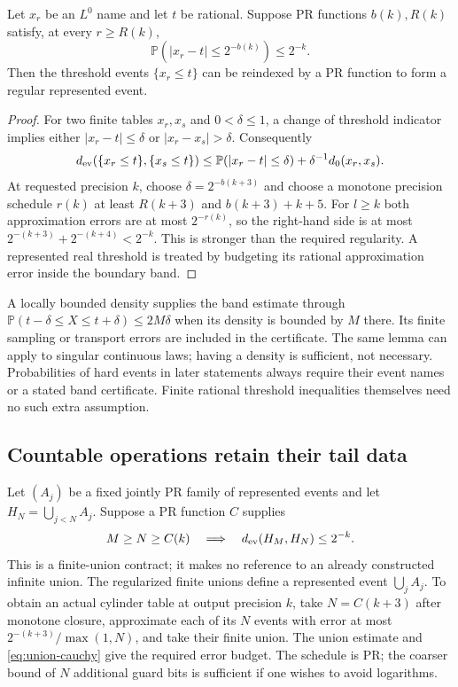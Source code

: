 \begin{lemma}
Let $x_r$ be an $L^0$ name and let $t$ be rational. Suppose PR functions
$b(k),R(k)$ satisfy, at every $r\ge R(k)$,
\[
 \mathbb P(|x_r-t|\le2^{-b(k)})\le2^{-k}.
\]
Then the threshold events $\{x_r\le t\}$ can be reindexed by a PR function
to form a regular represented event.
\end{lemma}
\begin{proof}
For two finite tables $x_r,x_s$ and $0<\delta\le1$, a change of threshold
indicator implies either $|x_r-t|\le\delta$ or $|x_r-x_s|>\delta$.
Consequently
\[
 d_{\rm ev}(\{x_r\le t\},\{x_s\le t\})
 \le\mathbb P(|x_r-t|\le\delta)+\delta^{-1}d_0(x_r,x_s).
\]
At requested precision $k$, choose $\delta=2^{-b(k+3)}$ and choose a
monotone precision schedule $r(k)$ at least
$R(k+3)$ and $b(k+3)+k+5$. For $l\ge k$ both approximation errors are
at most $2^{-r(k)}$, so the right-hand side is at most
$2^{-(k+3)}+2^{-(k+4)}<2^{-k}$. This is stronger than the required
regularity. A represented real threshold is treated by budgeting its rational
approximation error inside the boundary band.
\end{proof}

A locally bounded density supplies the band estimate through
$\mathbb P(t-\delta\le X\le t+\delta)\le2M\delta$ when its density is
bounded by $M$ there. Its finite sampling or transport errors are included
in the certificate. The same lemma can apply to singular continuous laws;
having a density is sufficient, not necessary. Probabilities of hard events
in later statements always require their event names or a stated band
certificate. Finite rational threshold inequalities themselves need no such
extra assumption.

\subsection{Countable operations retain their tail data}

Let $(A_j)$ be a fixed jointly PR family of represented events and let
$H_N=\bigcup_{j<N}A_j$. Suppose a PR function $C$ supplies
\begin{equation}\label{eq:union-cauchy}
 M\ge N\ge C(k)\quad\Longrightarrow\quad
 d_{\rm ev}(H_M,H_N)\le2^{-k}.
\end{equation}
This is a finite-union contract; it makes no reference to an already
constructed infinite union. The regularized finite unions define a
represented event $\bigcup_jA_j$. To obtain an actual cylinder table at
output precision $k$, take $N=C(k+3)$ after monotone closure, approximate
each of its $N$ events with error at most $2^{-(k+3)}/\max(1,N)$, and take
their finite union. The union estimate and \eqref{eq:union-cauchy} give the
required error budget. The schedule is PR; the coarser bound of $N$ additional
guard bits is sufficient if one wishes to avoid logarithms.

